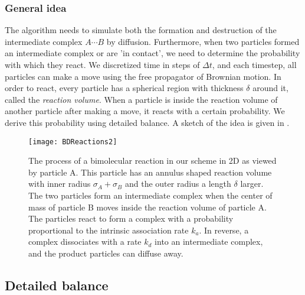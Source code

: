 \subsubsection{General idea}
The algorithm needs to simulate both the formation and destruction of the intermediate complex $A\cdots B$ by diffusion. Furthermore, when two particles formed an intermediate complex or are 'in contact', we need to determine the probability with which they react. We discretized time in steps of $\Delta t$, and each timestep, all particles can make a move using the free propagator of Brownian motion. In order to react, every particle has a spherical region with thickness $\delta$ around it, called the \emph{reaction volume}. When a particle is inside the reaction volume of another particle after making a move, it reacts with a certain probability. We derive this probability using detailed balance. A sketch of the idea is given in .

\begin{figure}[ht]
\centering
\texttt{[image: BDReactions2]}
\caption{ The process of a bimolecular reaction in our scheme in 2D as viewed by particle A. This particle has an annulus shaped reaction volume with inner radius $\sigma_A + \sigma_B$ and the outer radius a length $\delta$ larger. The two particles form an intermediate complex when the center of mass of particle B moves inside the reaction volume of particle A. The particles react to form a complex with a probability proportional to the intrinsic association rate $k_a$. In reverse, a complex dissociates with a rate $k_d$ into an intermediate complex, and the product particles can diffuse away.}
\end{figure}
 
\subsection{Detailed balance}

